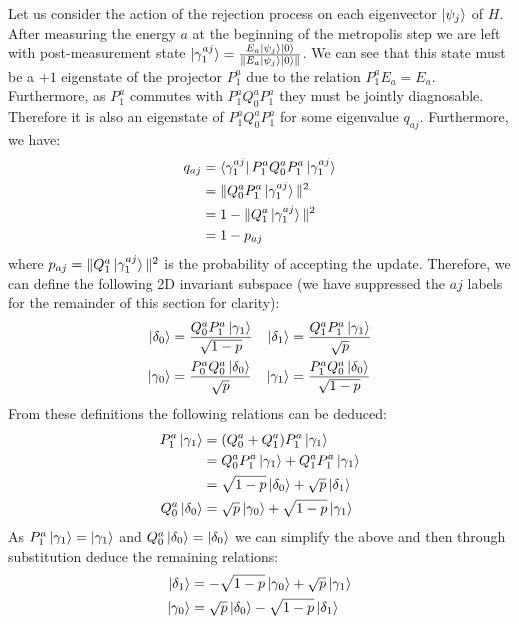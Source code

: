 \documentclass[aps,floatfix,10pt,amssymb,amsfont,amsmath,superscriptaddress,float,nofootinbib,longbibliography,nobalancelastpage,twocolumn]{revtex4-2}
\begin{document}
Let us consider the action of the rejection process on each eigenvector $\ket{\psi_j}$ of $H$. After measuring the energy $a$ at the beginning of the metropolis step we are left with post-measurement state $\ket{\gamma^{aj}_1} = \frac{E_a\ket{\psi_j}\ket{0}}{\|E_a \ket{\psi_j}\ket{0}\|}$. We can see that this state must be a $+1$ eigenstate of the projector $P^a_1$ due to the relation $P_1^aE_a = E_a$.  Furthermore, as $P_1^a$ commutes with $P^a_1Q^a_0P^a_1$ they must be jointly diagnosable. Therefore it is also an eigenstate of $P^a_1Q^a_0P^a_1$ for some eigenvalue $q_{aj}$.  Furthermore, we have: \begin{align}q_{aj}&=\bra{\gamma^{aj}_1}P^a_1Q^a_0P^a_1\ket{\gamma^{aj}_1} \\&=\|Q^a_0P^a_1\ket{\gamma^{aj}_1}\|^2\\ &= 1-\|Q^a_1\ket{\gamma^{aj}_1}\|^2\\ &= 1-p_{aj}
\end{align}
where $p_{aj} = \|Q^a_1\ket{\gamma^{aj}_1}\|^2$ is the probability of accepting the update. Therefore, we can define the following 2D invariant subspace (we have suppressed the $aj$ labels for the remainder of this section for clarity):
\begin{align}
    \ket{\delta_0} &= \frac{Q^a_0P^a_1\ket{\gamma_1}}{\sqrt{1-p}} &\ket{\delta_1} &= \frac{Q^a_1P^a_1\ket{\gamma_1}}{\sqrt{p}} \\
    \ket{\gamma_0} &= \frac{P^a_0Q^a_0\ket{\delta_0}}{\sqrt{p}} &\ket{\gamma_1} &= \frac{P^a_1Q^a_0\ket{\delta_0}}{\sqrt{1-p}}
\end{align}
From these definitions the following relations can be deduced:
\begin{align}
\begin{split}
\label{eq:deltagamma0}
    P^a_1 \ket{\gamma_1} &= (Q^a_0+Q^a_1)P^a_1 \ket{\gamma_1}\\
    &= Q^a_0P^a_1 \ket{\gamma_1}+Q^a_1P^a_1 \ket{\gamma_1}\\
    &= \sqrt{1-p} \ket{\delta_0} + \sqrt{p}\ket{\delta_1}\\
    Q^a_0\ket{\delta_0} &= \sqrt{p} \ket{\gamma_0} + \sqrt{1-p} \ket{\gamma_1}
\end{split}
\end{align}
As $P^a_1 \ket{\gamma_1} = \ket{\gamma_1}$ and $Q^a_0\ket{\delta_0} = \ket{\delta_0}$ we can simplify the above and then through substitution deduce the remaining relations:
\begin{align}
\begin{split}
\label{eq:deltagamma1}
        \ket{\delta_1} &= -\sqrt{1-p} \ket{\gamma_0} + \sqrt{p} \ket{\gamma_1}\\
    \ket{\gamma_0} &= \sqrt{p} \ket{\delta_0} - \sqrt{1-p}\ket{\delta_1}
\end{split}
\end{align}
\end{document}
